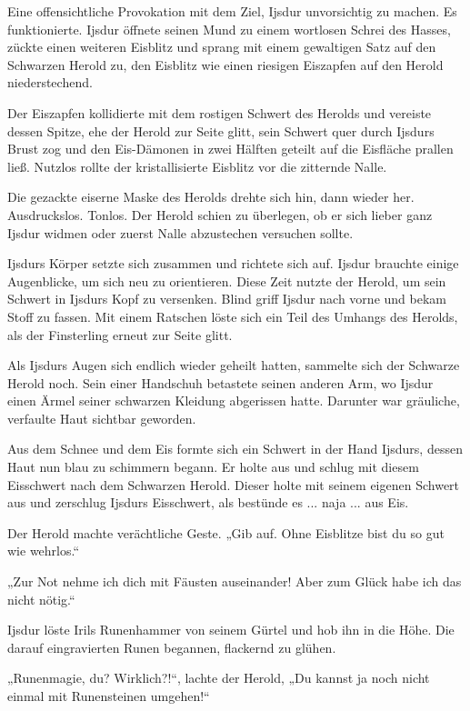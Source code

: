 Eine offensichtliche Provokation mit dem Ziel, Ijsdur unvorsichtig zu machen. Es funktionierte. Ijsdur öffnete seinen Mund zu einem wortlosen Schrei des Hasses, zückte einen weiteren Eisblitz und sprang mit einem gewaltigen Satz auf den Schwarzen Herold zu, den Eisblitz wie einen riesigen Eiszapfen auf den Herold niederstechend.

Der Eiszapfen kollidierte mit dem rostigen Schwert des Herolds und vereiste dessen Spitze, ehe der Herold zur Seite glitt, sein Schwert quer durch Ijsdurs Brust zog und den Eis-Dämonen in zwei Hälften geteilt auf die Eisfläche prallen ließ. Nutzlos rollte der kristallisierte Eisblitz vor die zitternde Nalle.

Die gezackte eiserne Maske des Herolds drehte sich hin, dann wieder her. Ausdruckslos. Tonlos. Der Herold schien zu überlegen, ob er sich lieber ganz Ijsdur widmen oder zuerst Nalle abzustechen versuchen sollte.

Ijsdurs Körper setzte sich zusammen und richtete sich auf. Ijsdur brauchte einige Augenblicke, um sich neu zu orientieren. Diese Zeit nutzte der Herold, um sein Schwert in Ijsdurs Kopf zu versenken. Blind griff Ijsdur nach vorne und bekam Stoff zu fassen. Mit einem Ratschen löste sich ein Teil des Umhangs des Herolds, als der Finsterling erneut zur Seite glitt.

Als Ijsdurs Augen sich endlich wieder geheilt hatten, sammelte sich der Schwarze Herold noch. Sein einer Handschuh betastete seinen anderen Arm, wo Ijsdur einen Ärmel seiner schwarzen Kleidung abgerissen hatte. Darunter war gräuliche, verfaulte Haut sichtbar geworden.

Aus dem Schnee und dem Eis formte sich ein Schwert in der Hand Ijsdurs, dessen Haut nun blau zu schimmern begann. Er holte aus und schlug mit diesem Eisschwert nach dem Schwarzen Herold. Dieser holte mit seinem eigenen Schwert aus und zerschlug Ijsdurs Eisschwert, als bestünde es ... naja ... aus Eis.

Der Herold machte verächtliche Geste. „Gib auf. Ohne Eisblitze bist du so gut wie wehrlos.“

„Zur Not nehme ich dich mit Fäusten auseinander! Aber zum Glück habe ich das nicht nötig.“

Ijsdur löste Irils Runenhammer von seinem Gürtel und hob ihn in die Höhe. Die darauf eingravierten Runen begannen, flackernd zu glühen.

„Runenmagie, du? Wirklich?!“, lachte der Herold, „Du kannst ja noch nicht einmal mit Runensteinen umgehen!“


